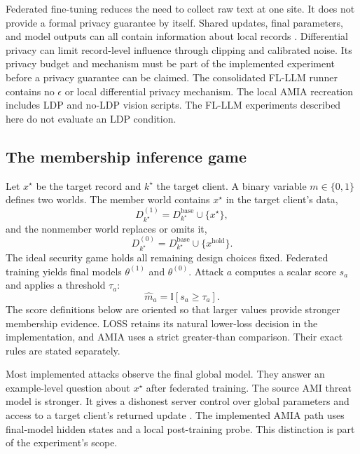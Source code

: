 \documentclass[11pt]{article}
\newcommand{\ind}{\mathbb{I}}
\begin{document}
Federated fine-tuning reduces the need to collect raw text at one site. It does not provide a formal privacy guarantee by itself. Shared updates, final parameters, and model outputs can all contain information about local records \citep{yao2026federated,wu2026survey}. Differential privacy can limit record-level influence through clipping and calibrated noise. Its privacy budget and mechanism must be part of the implemented experiment before a privacy guarantee can be claimed. The consolidated FL-LLM runner contains no $\epsilon$ or local differential privacy mechanism. The local AMIA recreation includes LDP and no-LDP vision scripts. The FL-LLM experiments described here do not evaluate an LDP condition.

\subsection{The membership inference game}

Let $x^\star$ be the target record and $k^\star$ the target client. A binary variable $m\in\{0,1\}$ defines two worlds. The member world contains $x^\star$ in the target client's data,
\begin{equation}
    D_{k^\star}^{(1)}=D_{k^\star}^{\mathrm{base}}\cup\{x^\star\},
\end{equation}
and the nonmember world replaces or omits it,
\begin{equation}
    D_{k^\star}^{(0)}=D_{k^\star}^{\mathrm{base}}\cup\{x^{\mathrm{hold}}\}.
\end{equation}
The ideal security game holds all remaining design choices fixed. Federated training yields final models $\theta^{(1)}$ and $\theta^{(0)}$. Attack $a$ computes a scalar score $s_a$ and applies a threshold $\tau_a$:
\begin{equation}
    \widehat m_a=\ind[s_a\geq\tau_a].
    \label{eq:generic-decision}
\end{equation}
The score definitions below are oriented so that larger values provide stronger membership evidence. LOSS retains its natural lower-loss decision in the implementation, and AMIA uses a strict greater-than comparison. Their exact rules are stated separately.

Most implemented attacks observe the final global model. They answer an example-level question about $x^\star$ after federated training. The source AMI threat model is stronger. It gives a dishonest server control over global parameters and access to a target client's returned update \citep{nguyen2023active}. The implemented AMIA path uses final-model hidden states and a local post-training probe. This distinction is part of the experiment's scope.
\end{document}
